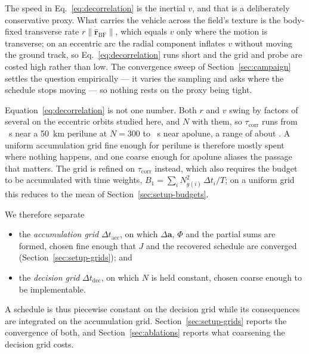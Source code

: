 The speed in Eq.~\eqref{eq:decorrelation} is the inertial $v$, and that is a
deliberately conservative proxy. What carries the vehicle across the field's
texture is the body-fixed transverse rate $r\lVert\dot{\hat{\mathbf r}}_{\mathrm{BF}}\rVert$,
which equals $v$ only where the motion is transverse; on an eccentric arc the
radial component inflates $v$ without moving the ground track, so
Eq.~\eqref{eq:decorrelation} runs short and the grid and probe are costed
high rather than low. The convergence sweep of Section~\ref{sec:campaign}
settles the question empirically --- it varies the sampling and asks where the
schedule stops moving --- so nothing rests on the proxy being tight.

Equation~\eqref{eq:decorrelation} is not one number. Both $r$ and $v$ swing by
factors of several on the eccentric orbits studied here, and $N$ with them, so
$\tau_{\mathrm{corr}}$ runs from ~s near a 50~km perilune at $N=300$
to ~s near apolune, a range of about . A uniform
accumulation grid fine enough for perilune is therefore mostly spent where
nothing happens, and one coarse enough for apolune aliases the passage that
matters. The grid is refined on $\tau_{\mathrm{corr}}$ instead, which also
requires the budget to be accumulated with time weights,
$B_1 = \sum_i N_{g(i)}^2\,\Delta t_i / T$; on a uniform grid this reduces to
the mean of Section~\ref{sec:setup-budgets}. 

We therefore separate

\begin{itemize}
  \item the \emph{accumulation grid} $\Delta t_{\mathrm{acc}}$, on which
    $\Delta\mathbf a$, $\Phi$ and the partial sums are formed, chosen fine
    enough that $J$ and the recovered schedule are converged
    (Section~\ref{sec:setup-grids}); and
  \item the \emph{decision grid} $\Delta t_{\mathrm{dec}}$, on which $N$ is held
    constant, chosen coarse enough to be implementable.
\end{itemize}

A schedule is thus piecewise constant on the decision grid while its
consequences are integrated on the accumulation grid. Section~\ref{sec:setup-grids}
reports the convergence of both, and Section~\ref{sec:ablations} reports what
coarsening the decision grid costs. 
